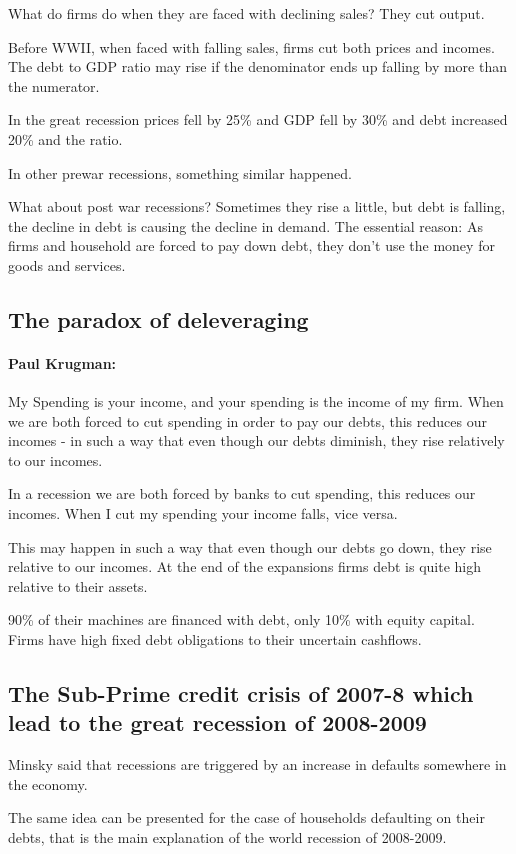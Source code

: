 \documentclass{report}
\begin{document}
What do firms do when they are faced with declining sales? They cut output. 

Before WWII, when faced with falling sales, firms cut both prices and incomes. The debt to GDP ratio may rise if the denominator ends up falling by more than the numerator.

In the great recession prices fell by 25\% and GDP fell by 30\% and debt increased 20\% and the ratio.

In other prewar recessions, something similar happened. 

What about post war recessions?
Sometimes they rise a little, but debt is falling, the decline in debt is causing the decline in demand. The essential reason:
As firms and household are forced to pay down debt, they don’t use the money for goods and services. 

\subsection{The paradox of deleveraging}
\paragraph{Paul Krugman:} My Spending is your income, and your spending is the income of my firm. When we are both forced to cut spending in order to pay our debts, this reduces our incomes - in such a way that even though our debts diminish, they rise relatively to our incomes.

In a recession we are both forced by banks to cut spending, this reduces our incomes. When I cut my spending your income falls, vice versa. 

This may happen in such a way that even though our debts go down, they rise relative to our incomes.
At the end of the expansions firms debt is quite high relative to their assets. 

90\% of their machines are financed with debt, only 10\% with equity capital. Firms have high fixed debt obligations to their uncertain cashflows. 

\subsection{The Sub-Prime credit crisis of 2007-8 which lead to the great recession of 2008-2009}

Minsky said that recessions are triggered by an increase in defaults somewhere in the economy. 

The same idea can be presented for the case of households defaulting on their debts, that is the main explanation of the world recession of 2008-2009.
\end{document}
